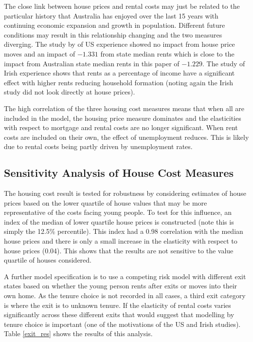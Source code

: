 \documentclass[12pt]{article}
\begin{document}
The close link between house prices and rental costs may just be related to the particular history that Australia has enjoyed over the last 15 years with continuing economic expansion and growth in population. Different future conditions may result in this relationship changing and the two measures diverging. The study by \cite{lee2013happens} of US experience showed no impact from house price moves and an impact of $-1.331$ from state median rents which is close to the impact from Australian state median rents in this paper of $-1.229$. The study of Irish experience \parencite{byrne2014household} shows that rents as a percentage of income have a significant effect with higher rents reducing household formation (noting again the Irish study did not look directly at house prices).

The high correlation of the three housing cost measures means that when all are included in the model, the housing price measure dominates and the elasticities with respect to mortgage and rental costs are no longer significant. When rent costs are included on their own, the effect of unemployment reduces. This is likely due to rental costs being partly driven by unemployment rates.

\subsection{Sensitivity Analysis of House Cost Measures}

The housing cost result is tested for robustness by considering estimates of house prices based on the lower quartile of house values that may be more representative of the costs facing young people. To test for this influence, an index of the median of lower quartile house prices is constructed (note this is simply the 12.5\% percentile). This index had a 0.98 correlation with the median house prices and there is only a small increase in the elasticity with respect to house prices (0.04). This shows that the results are not sensitive to the value quartile of houses considered.

A further model specification is to use a competing risk model with different exit states based on whether the young person rents after exits or moves into their own home. As the tenure choice is not recorded in all cases, a third exit category is where the exit is to unknown tenure. If the elasticity of rental costs varies significantly across these different exits that would suggest that modelling by tenure choice is important (one of the motivations of the US and Irish studies). Table \ref{exit_res} shows the results of this analysis.
\end{document}
